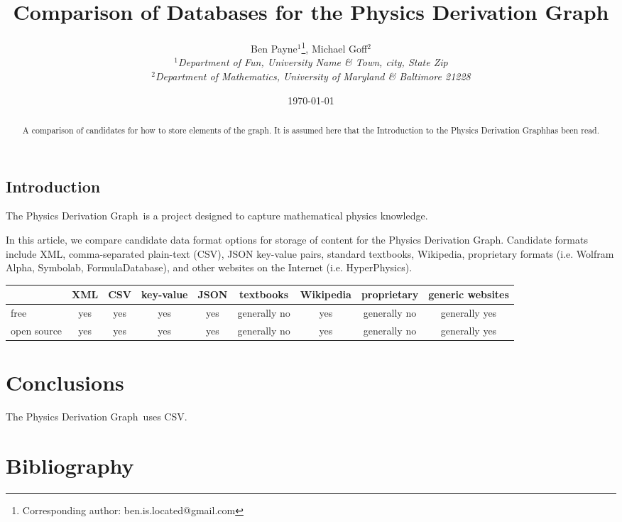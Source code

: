 \documentclass{article}
\newcommand{\pdg}{Physics Derivation Graph}
\begin{document}
\title{Comparison of Databases for the \pdg}

\author{Ben Payne$^{1}$\footnote{Corresponding author: ben.is.located@gmail.com}, Michael Goff$^{2}$\\
{\it $^{1}$Department of Fun, University Name \& Town, city, State Zip}\\
{\it $^{2}$Department of Mathematics, University of Maryland \& Baltimore 21228}}

\date{\today}


\maketitle %

\begin{abstract}
A comparison of candidates for how to store elements of the graph. It is assumed here that the Introduction to the \pdg has been read. 
\end{abstract}

\begin{multicols}{2}

\section{Introduction}

The \pdg\ is a project designed to capture mathematical physics knowledge. 


In this article, we compare candidate data format options for storage of content for the \pdg. Candidate formats include XML\cite{2008_XML}, comma-separated plain-text (CSV), JSON key-value pairs, standard textbooks, Wikipedia, proprietary formats (i.e. Wolfram Alpha, Symbolab, FormulaDatabase), and other websites on the Internet (i.e. HyperPhysics). 
\end{multicols}
\begin{tabular}{|l|c|c|c|c|c|c|c|c|}\hline
                     & XML & CSV & key-value & JSON & textbooks     & Wikipedia & proprietary   & generic websites \\\hline
free               & yes  & yes   & yes           & yes     & generally no & yes           & generally no & generally yes \\\hline
open source & yes   & yes  & yes            & yes    & generally no & yes            & generally no & generally yes \\\hline
\end{tabular}
\begin{multicols}{2}

\section{Conclusions}
The \pdg\ uses CSV.

\section{Bibliography}


\end{multicols}

%
\end{document}
